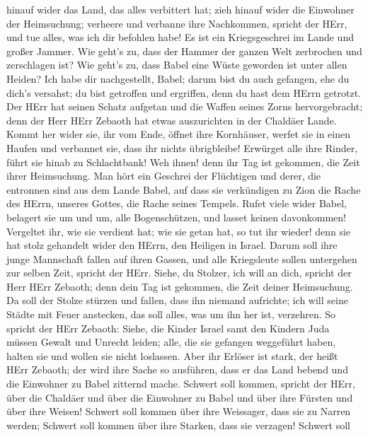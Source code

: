 hinauf wider das Land, das alles verbittert hat; zieh hinauf wider die
Einwohner der Heimsuchung; verheere und verbanne ihre Nachkommen,
spricht der HErr, und tue alles, was ich dir befohlen habe!
 Es ist ein Kriegsgeschrei im Lande und großer Jammer.
 Wie geht's zu, dass der Hammer der ganzen Welt zerbrochen
und zerschlagen ist? Wie geht's zu, dass Babel eine Wüste geworden ist
unter allen Heiden?  Ich habe dir nachgestellt, Babel;
darum bist du auch gefangen, ehe du dich's versahst; du bist getroffen
und ergriffen, denn du hast dem HErrn getrotzt.  Der HErr
hat seinen Schatz aufgetan und die Waffen seines Zorns hervorgebracht;
denn der Herr HErr Zebaoth hat etwas auszurichten in der Chaldäer Lande.
 Kommt her wider sie, ihr vom Ende, öffnet ihre Kornhäuser,
werfet sie in einen Haufen und verbannet sie, dass ihr nichts
übrigbleibe!  Erwürget alle ihre Rinder, führt sie hinab zu
Schlachtbank! Weh ihnen! denn ihr Tag ist gekommen, die Zeit ihrer
Heimsuchung.  Man hört ein Geschrei der Flüchtigen und
derer, die entronnen sind aus dem Lande Babel, auf dass sie verkündigen
zu Zion die Rache des HErrn, unseres Gottes, die Rache seines Tempels.
 Rufet viele wider Babel, belagert sie um und um, alle
Bogenschützen, und lasset keinen davonkommen! Vergeltet ihr, wie sie
verdient hat; wie sie getan hat, so tut ihr wieder! denn sie hat stolz
gehandelt wider den HErrn, den Heiligen in Israel.  Darum
soll ihre junge Mannschaft fallen auf ihren Gassen, und alle Kriegsleute
sollen untergehen zur selben Zeit, spricht der HErr. 
Siehe, du Stolzer, ich will an dich, spricht der Herr HErr Zebaoth; denn
dein Tag ist gekommen, die Zeit deiner Heimsuchung.  Da
soll der Stolze stürzen und fallen, dass ihn niemand aufrichte; ich will
seine Städte mit Feuer anstecken, das soll alles, was um ihn her ist,
verzehren.  So spricht der HErr Zebaoth: Siehe, die Kinder
Israel samt den Kindern Juda müssen Gewalt und Unrecht leiden; alle, die
sie gefangen weggeführt haben, halten sie und wollen sie nicht
loslassen.  Aber ihr Erlöser ist stark, der heißt HErr
Zebaoth; der wird ihre Sache so ausführen, dass er das Land bebend und
die Einwohner zu Babel zitternd mache.  Schwert soll
kommen, spricht der HErr, über die Chaldäer und über die Einwohner zu
Babel und über ihre Fürsten und über ihre Weisen!  Schwert
soll kommen über ihre Weissager, dass sie zu Narren werden; Schwert soll
kommen über ihre Starken, dass sie verzagen!  Schwert soll
